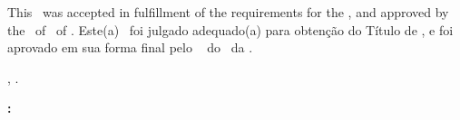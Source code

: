 


\begin{folhadeaprovacao}

    \begin{center}
        {\imprimirautor}

        \begin{center}
            \ABNTEXchapterfont\bfseries\MakeUppercase{\imprimirtitulo}\ifnotempty{\imprimirsubtitulo}{: \imprimirsubtitulo}
        \end{center}

        \begin{minipage}{\textwidth}
            \lang
            {
                This \imprimirtipotrabalho~was accepted in fulfillment of the requirements for the \imprimirformacao,
                and approved by the \imprimirprograma~of \imprimircentro~of \imprimirinstituicao.
            }
            {
                Este(a) \imprimirtipotrabalho~foi julgado adequado(a) para obtenção do Título de \imprimirformacao,
                e foi aprovado em sua forma final pelo \imprimirprograma~
                do \imprimircentro~da \imprimirinstituicao.
            }
         \end{minipage}%
    \end{center}

    \begin{center}
        \imprimirlocal, \imprimirdata.
    \end{center}


    \begin{flushleft}
        \textbf{:}
    \end{flushleft}

    \assinatura{%
        \textbf{\imprimirorientador} \\ \imprimirorientadorRotulo\\
        \imprimirinstituicao~--~\imprimirinstituicaosigla
    }

    \ifnotempty{\imprimircoorientador}{%
        \assinatura{%
            \textbf{\imprimircoorientador} \\ \imprimircoorientadorRotulo \\
            \imprimirinstituicao~--~\imprimirinstituicaosigla
        }
    }


\end{folhadeaprovacao}
